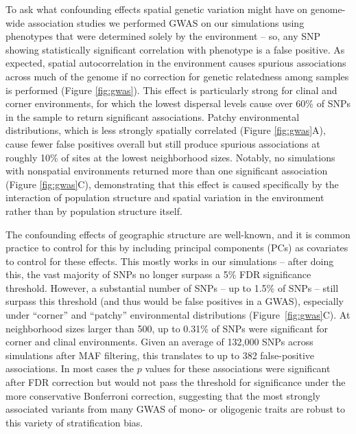 \documentclass[11pt,twoside,lineno]{preprint}
\begin{document}
To ask what confounding effects spatial genetic variation might have on genome-wide association studies we performed GWAS on our simulations using phenotypes that were determined solely by the environment
-- so, any SNP showing statistically significant correlation with phenotype is a false positive. 
As expected, spatial autocorrelation in the environment causes spurious associations 
across much of the genome if no correction for genetic relatedness among samples is performed (Figure \ref{fig:gwas}). 
This effect is particularly strong for clinal and corner environments, 
for which the lowest dispersal levels cause over 60\% of SNPs in the sample to return significant associations. 
Patchy environmental distributions, which is less strongly spatially correlated (Figure \ref{fig:gwas}A), 
cause fewer false positives overall but still produce spurious associations at roughly 10\% of sites at the lowest neighborhood sizes. 
Notably, no simulations with nonspatial environments returned more than one significant association (Figure \ref{fig:gwas}C), 
demonstrating that this effect is caused specifically by the interaction of population structure and spatial variation in the environment rather than by population structure itself.  

The confounding effects of geographic structure are well-known, 
and it is common practice to control for this by including principal components (PCs) as covariates to control for these effects.
This mostly works in our simulations -- after doing this, the vast majority of SNPs no longer surpass a 5\% FDR significance threshold. 
However, a substantial number of SNPs -- up to 1.5\% of SNPs -- still surpass this threshold (and thus would be false positives in a GWAS),
especially under ``corner'' and ``patchy'' environmental distributions (Figure~\ref{fig:gwas}C). 
At neighborhood sizes larger than 500, up to 0.31\% of SNPs were significant for corner and clinal environments. 
Given an average of 132,000 SNPs across simulations after MAF filtering, this translates to up to 382 false-positive associations. 
In most cases the $p$ values for these associations were significant after FDR correction but would not pass the threshold for significance under the more conservative Bonferroni correction, suggesting that the most strongly associated variants from many GWAS of mono- or oligogenic traits are robust to this variety of stratification bias. 
\end{document}
